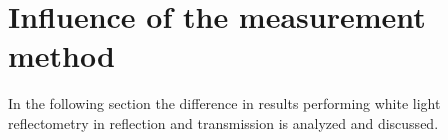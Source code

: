 \section{Influence of the measurement method}
\label{sec:Method}

In the following section the difference in results performing white light reflectometry in reflection
and transmission is analyzed and discussed.

